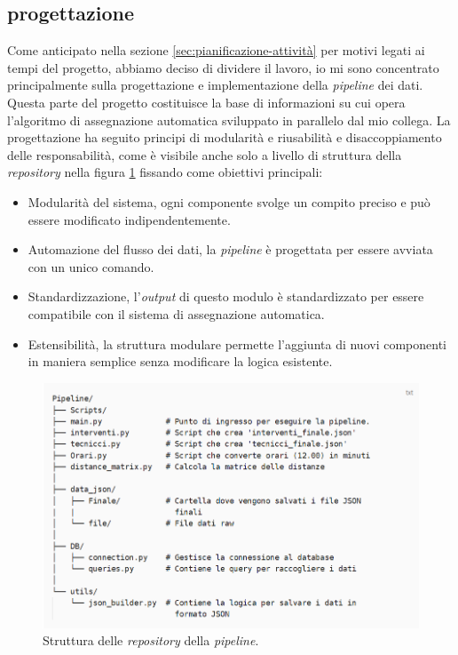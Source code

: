 \subsection{progettazione}
Come anticipato nella sezione \ref{sec:pianificazione-attività} per motivi legati ai tempi del progetto, abbiamo deciso di dividere il lavoro, io mi sono concentrato principalmente sulla progettazione e implementazione della \textit{pipeline} dei dati.
Questa parte del progetto costituisce la base di informazioni su cui opera l'algoritmo di assegnazione automatica sviluppato in parallelo dal mio collega.
La progettazione ha seguito principi di modularità e riusabilità e disaccoppiamento delle responsabilità, come è visibile anche solo a livello di struttura della \textit{repository} nella figura \ref{fig:atruttura-pipeline} fissando come obiettivi principali:
\begin{itemize}
    \item Modularità del sistema, ogni componente svolge un compito preciso e può essere modificato indipendentemente.
    \item Automazione del flusso dei dati, la \textit{pipeline} è progettata per essere avviata con un unico comando.
    \item Standardizzazione, l'\textit{output} di questo modulo è standardizzato per essere compatibile con il sistema di assegnazione automatica.
    \item Estensibilità, la struttura modulare permette l'aggiunta di nuovi componenti in maniera semplice senza modificare la logica esistente.
\end{itemize}

\begin{figure}[H]
    \centering
    \includegraphics[width=\textwidth]{thesis/files/img/Cattura.PNG}
    \caption{Struttura delle \textit{repository} della \textit{pipeline}.}
    \label{fig:atruttura-pipeline}
\end{figure}

